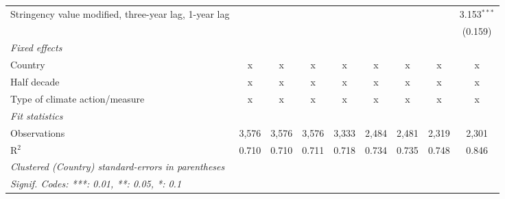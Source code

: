 \begin{table}[htbp]
\begin{tabular}{lcccccccc}
      Stringency value modified, three-year lag, 1-year lag                                            &         &         &             &              &               &               &              & 3.153$^{***}$\\   
                                                                                                       &         &         &             &              &               &               &              & (0.159)\\   
      \emph{Fixed effects}\\
      Country                                                                                          & x       & x       & x           & x            & x             & x             & x            & x\\  
      Half decade                                                                                      & x       & x       & x           & x            & x             & x             & x            & x\\  
      Type of climate action/measure                                                                   & x       & x       & x           & x            & x             & x             & x            & x\\  
      \midrule \emph{Fit statistics}\\
      Observations                                                                                     & 3,576   & 3,576   & 3,576       & 3,333        & 2,484         & 2,481         & 2,319        & 2,301\\  
      R$^2$                                                                                            & 0.710   & 0.710   & 0.711       & 0.718        & 0.734         & 0.735         & 0.748        & 0.846\\  
      \midrule
      \multicolumn{9}{l}{\emph{Clustered (Country) standard-errors in parentheses}}\\
      \multicolumn{9}{l}{\emph{Signif. Codes: ***: 0.01, **: 0.05, *: 0.1}}\\
   \end{tabular}
\end{table}


